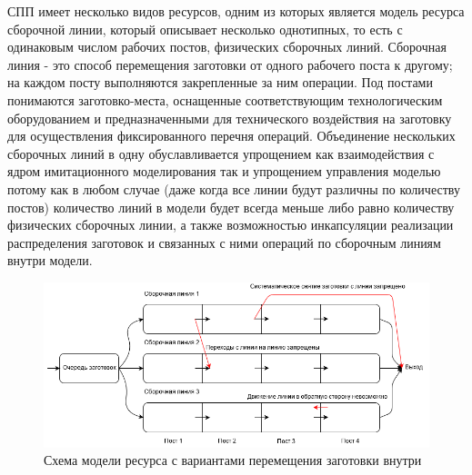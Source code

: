 \indent СПП имеет несколько видов ресурсов, одним из которых является модель ресурса сборочной линии, который описывает несколько однотипных, то есть с одинаковым числом рабочих постов, физических сборочных линий.
Сборочная линия - это способ перемещения заготовки от одного рабочего поста к другому; на каждом посту выполняются закрепленные за ним операции.
Под постами понимаются заготовко-места, оснащенные соответствующим технологическим оборудованием и предназначенными для технического воздействия на заготовку для осуществления фиксированного перечня операций.
Объединение нескольких сборочных линий в одну обуславливается упрощением как взаимодействия с ядром имитационного моделирования так и упрощением управления моделью потому как в любом случае (даже когда все линии будут различны по количеству постов) количество линий в модели будет всегда меньше либо равно количеству физических сборочных линии, а также возможностью инкапсуляции реализации распределения заготовок и связанных с ними операций по сборочным линиям внутри модели.

\begin{figure}[ht]	
	\centering	
	\includegraphics[width=\linewidth]{pics/assemblyMain.png}
	\caption{Схема модели ресурса с вариантами перемещения заготовки внутри}
	\label{fig:assemblyMain}
\end{figure}

